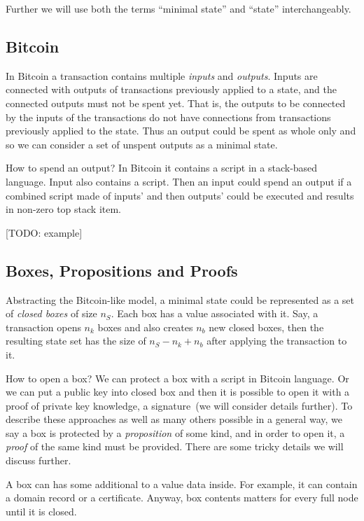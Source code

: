 \documentclass[]{report}   %
\begin{document}
Further we will use both the terms ``minimal state'' and ``state'' interchangeably. 


\subsection{Bitcoin}

In Bitcoin a transaction contains multiple \textit{inputs} and \textit{outputs}. Inputs are connected with outputs of transactions previously applied to a state, and the connected outputs must not be spent yet. That is, the outputs to be connected by the inputs of the transactions do not have connections from transactions previously applied to the state. Thus an output could be spent as whole only and so we can consider a set of unspent outputs as a minimal state.

How to spend an output? In Bitcoin it contains a script in a stack-based language. Input also contains a script. Then an input could spend an output if a combined script made of inputs' and then outputs' could be executed and results in non-zero top stack item.

[TODO: example]

\subsection{Boxes, Propositions and Proofs}

Abstracting the Bitcoin-like model, a minimal state could be represented as a set of \textit{closed boxes} of size \(n_S\). Each box has a value associated with it. Say, a transaction opens \(n_k\) boxes and also creates \(n_b\) new closed boxes, then the resulting state set has the size of \(n_S-n_k+n_b\) after applying the transaction to it. 

How to open a box? We can protect a box with a script in Bitcoin language. Or we can put a public key into closed box and then it is possible to open it with a proof of private key knowledge, a signature~(we will consider details further). To describe these approaches as well as many others possible in a general way, we say a box is protected by a \textit{proposition} of some kind, and in order to open it, a \textit{proof} of the same kind must be provided. There are some tricky details we will discuss further.

A box can has some additional to a value data inside. For example, it can contain a domain record or a certificate. Anyway, box contents matters for every full node until it is closed. 
\end{document}
